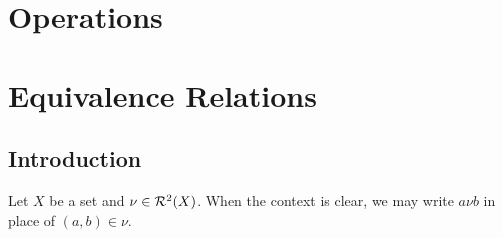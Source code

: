 \chapter{Operations}











































































\newpage
\chapter{Equivalence Relations}

\section{Introduction}

\begin{note}
	Let $X$ be a set and $\nu \in \mathcal{R}^2(X)$. When the context is clear, we may write $a \nu b$ in place of $(a,b) \in \nu$.
\end{note}

